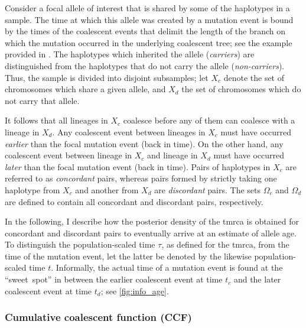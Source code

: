 Consider a focal allele of interest that is shared by some of the haplotypes in a sample.
The time at which this allele was created by a mutation event is bound by the times of the  coalescent events that delimit the length of the branch on which the mutation occurred in the underlying coalescent tree; see the example provided in .
The haplotypes which inherited the allele (\emph{carriers}) are distinguished from the haplotypes that do not carry the allele (\emph{non-carriers}).
Thus, the sample is divided into  disjoint subsamples; let $X_c$ denote the set of chromosomes which share a given allele, and $X_d$ the set of chromosomes which do not carry that allele.

%

%

It follows that all lineages in $X_c$ coalesce before any of them can coalesce with a lineage in $X_d$.
Any coalescent event between  lineages in $X_c$ must have occurred \emph{earlier} than the focal mutation event (back in time).
On the other hand, any coalescent event between  lineage in $X_c$ and  lineage in $X_d$ must have occurred \emph{later} than the focal mutation event (back in time).
Pairs of haplotypes in $X_c$ are referred to as \emph{concordant} pairs, whereas pairs formed by strictly taking one haplotype from $X_c$ and another from $X_d$ are \emph{discordant} pairs.
The sets $\Omega_c$ and $\Omega_d$ are defined to contain all concordant and discordant pairs, respectively.

In the following, I describe how the posterior density of the \gls{tmrca} is obtained for concordant and discordant pairs to eventually arrive at an estimate of allele age.
To distinguish the population-scaled time $\tau$, as defined for the \gls{tmrca}, from the time of the mutation event, let the latter be denoted by the likewise population-scaled time $t$.
Informally, the actual time of a mutation event is found at the ``sweet~spot'' in between the earlier coalescent event at time $t_c$ and the later coalescent event at time $t_d$; see \cref{fig:info_age}.



%
\subsubsection{Cumulative coalescent function (CCF)}\label{sec:ccf_desc}
%



